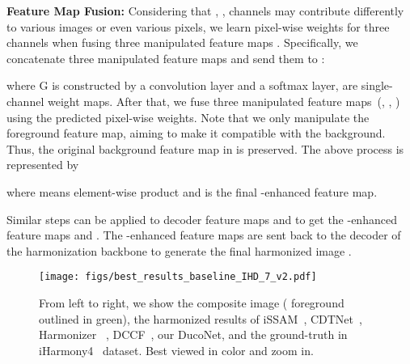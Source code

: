 \documentclass[sigconf]{acmart}
\begin{document}
\noindent\textbf{Feature Map Fusion: } Considering that , ,  channels may contribute differently to various images or even various pixels, we learn pixel-wise weights  for three channels when fusing three manipulated feature maps . Specifically, we concatenate three manipulated feature maps and send them to :

where G is constructed by a  convolution layer and a softmax layer,  are single-channel weight maps. After that, we fuse three manipulated feature maps~(, , ) using the predicted pixel-wise weights. Note that we only manipulate the foreground feature map, aiming to make it compatible with the background. Thus, the original background feature map in  is preserved. The above process is represented by

where  means element-wise product and  is the final -enhanced feature map. 

Similar steps can be applied to decoder feature maps  and  to get the -enhanced feature maps  and . The -enhanced feature maps are sent back to the decoder of the harmonization backbone to generate the final harmonized image .


\begin{figure*}[htbp]
  \centering
  \texttt{[image: figs/best\_results\_baseline\_IHD\_7\_v2.pdf]}
  \caption{From left to right, we show the composite image ( foreground outlined  in green), the harmonized results of iSSAM~\cite{issam}, CDTNet~\cite{CDTNet}, Harmonizer ~\cite{harmonizer}, DCCF~\cite{DCCF}, our DucoNet, and the ground-truth in iHarmony4~\cite{dovenet} dataset. Best viewed in color and zoom in.}
  \Description{}
  \label{fig:baseline_IHD}
\end{figure*}
\end{document}
